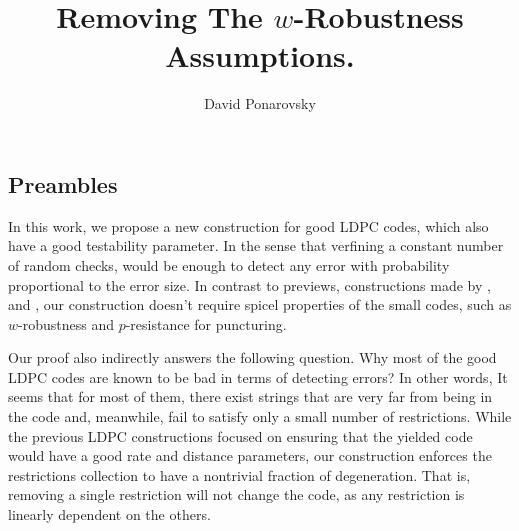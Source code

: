 \documentclass[sigplan,screen]{acmart}
\begin{document}
\title{Removing The $w$-Robustness Assumptions.} 
\author{David Ponarovsky}
\maketitle
{} 
\begin{multicols*}{2}
  \section{Preambles}
  In this work, we propose a new construction for good LDPC codes, which also have a good testability parameter. In the sense that verfining a constant number of random checks, would be enough to detect any error with probability proportional to the error size. In contrast to previews, constructions made by \cite{Dinur}, \cite{leverrier2022quantum} and \cite{Pavel}, our construction doesn't require spicel properties of the small codes, such as $w$-robustness and $p$-resistance for puncturing. 
  
  Our proof also indirectly answers the following question. Why most of the good LDPC codes are known to be bad in terms of detecting errors? In other words, It seems that for most of them, there exist strings that are very far from being in the code and, meanwhile, fail to satisfy only a small number of restrictions.
  While the previous LDPC constructions focused on ensuring that the yielded code would have a good rate and distance parameters, our construction enforces the restrictions collection to have a nontrivial fraction of degeneration. That is, removing a single restriction will not change the code, as any restriction is linearly dependent on the others.




\end{multicols*}
\end{document}

